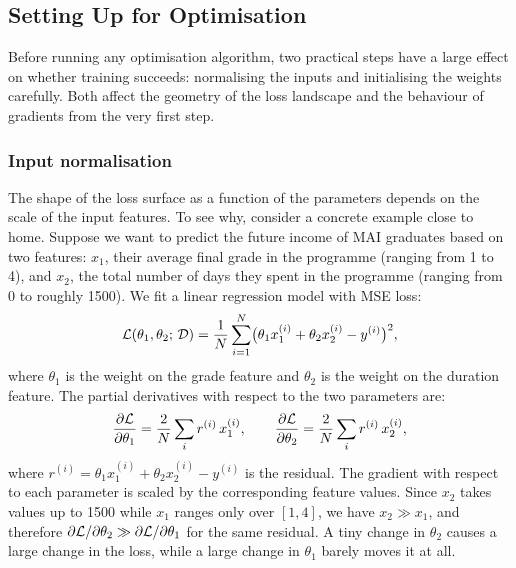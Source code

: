 \subsection{Setting Up for Optimisation}

Before running any optimisation algorithm, two practical steps have a large effect on whether training succeeds: normalising the inputs and initialising the weights carefully. Both affect the geometry of the loss landscape and the behaviour of gradients from the very first step.

\subsubsection{Input normalisation}
\label{sec:input_norm}

The shape of the loss surface as a function of the parameters depends on the scale of the input features. To see why, consider a concrete example close to home. Suppose we want to predict the future income of MAI graduates based on two features: $x_1$, their average final grade in the programme (ranging from 1 to 4), and $x_2$, the total number of days they spent in the programme (ranging from 0 to roughly 1500). We fit a linear regression model with MSE loss:
\begin{equation}
    \mathcal{L}(\theta_1, \theta_2;\, \mathcal{D}) = \frac{1}{N}\sum_{i=1}^{N}
    \bigl(\theta_1 x_1^{(i)} + \theta_2 x_2^{(i)} - y^{(i)}\bigr)^2,
\end{equation}
where $\theta_1$ is the weight on the grade feature and $\theta_2$ is the weight on the duration feature. The partial derivatives with respect to the two parameters are:
\begin{equation}
    \frac{\partial \mathcal{L}}{\partial \theta_1} = \frac{2}{N}\sum_i r^{(i)}\, x_1^{(i)},
    \qquad
    \frac{\partial \mathcal{L}}{\partial \theta_2} = \frac{2}{N}\sum_i r^{(i)}\, x_2^{(i)},
\end{equation}
where $r^{(i)} = \theta_1 x_1^{(i)} + \theta_2 x_2^{(i)} - y^{(i)}$ is the residual. The gradient with respect to each parameter is scaled by the corresponding feature values. Since $x_2$ takes values up to 1500 while $x_1$ ranges only over $[1, 4]$, we have $x_2 \gg x_1$, and therefore $\partial\mathcal{L}/\partial\theta_2 \gg \partial\mathcal{L}/\partial\theta_1$ for the same residual. A tiny change in $\theta_2$ causes a large change in the loss, while a large change in $\theta_1$ barely moves it at all.

